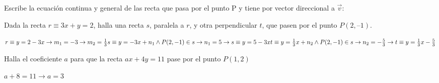 \documentclass[spanish, 11pt]{exam}
\begin{document}
\begin{questions}
\question Escribe la ecuación continua y general de las recta que pasa por el punto P y tiene por vector direccional a $\overrightarrow{v}$:
\begin{multicols}{2}
\end{multicols}


\question Dada la recta $r\equiv 3x + y = 2$, halla una recta $s$, paralela a $r$, y otra perpendicular $t$, que pasen por el punto $P(2, – 1)$.
\begin{solution} $r\equiv y=2-3x \to m_1=-3 \to m_2=\frac{1}{3}\\ s\equiv y=-3x+n_1 \land P(2,-1) \in s \to n_1=5 \to s\equiv y=5-3x \\
t\equiv y=\frac{1}{3}x+n_2 \land P(2,-1) \in s \to n_2=-\frac{5}{3} \to t\equiv y=\frac{1}{3}x-\frac{5}{3} \\ $\end{solution}

\question Halla el coeficiente $a$ para que la recta $ax + 4y = 11$ pase por el punto $P(1, 2)$
\begin{solution} $ a+8=11 \to a=3$ \end{solution}


\end{questions}
\end{document}
